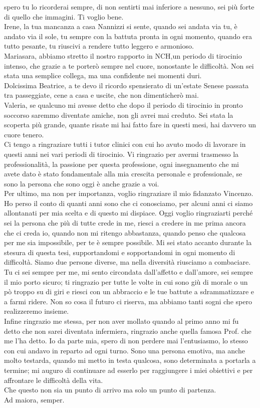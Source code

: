 spero tu lo ricorderai sempre, di non sentirti mai inferiore a nessuno, sei più forte di quello che immagini. 
Ti voglio bene.\\
Irene, la tua mancanza a casa Nannizzi si sente, quando sei andata via tu, è andato via il sole, tu sempre 
con la battuta pronta in ogni momento, quando era tutto pesante, tu riuscivi a rendere tutto leggero e armonioso.\\
Mariasara, abbiamo stretto il nostro rapporto in NCH,un periodo di tirocinio intenso, che grazie a te porterò sempre 
nel cuore, nonostante le difficoltà. Non sei stata una semplice collega, ma una confidente nei momenti duri.\\
Dolcissima Beatrice, a te devo il ricordo spensierato di un'estate Senese passata tra passeggiate, cene a casa e 
uscite, che non dimenticherò mai.\\
Valeria, se qualcuno mi avesse detto che dopo il periodo di tirocinio in pronto soccorso saremmo diventate amiche, 
non gli avrei mai creduto. Sei stata la scoperta più grande, quante risate mi hai fatto fare in questi mesi, 
hai davvero un cuore tenero.\\
Ci tengo a ringraziare tutti i tutor clinici con cui ho avuto modo di lavorare in questi anni nei vari periodi di 
tirocinio. Vi ringrazio per avermi trasmesso la professionalità, la passione per questa professione, ogni insegnamento 
che mi avete dato è stato fondamentale alla mia crescita personale e professionale, se sono la persona che sono 
oggi è anche grazie a voi.\\
Per ultimo, ma non per importanza, voglio ringraziare il mio fidanzato Vincenzo. Ho perso il conto di quanti anni sono 
che ci conosciamo, per alcuni anni ci siamo allontanati per mia scelta e di questo mi dispiace. Oggi voglio ringraziarti 
perché sei la persona che più di tutte crede in me, riesci a credere in me prima ancora che ci creda io, quando non mi 
ritengo abbastanza, quando penso che qualcosa per me sia impossibile, per te è sempre possibile. Mi sei stato accanto 
durante la stesura di questa tesi, supportandomi e sopportandomi in ogni momento di difficoltà. Siamo due persone diverse, 
ma nella diversità riusciamo a combaciare. Tu ci sei sempre per me, mi sento circondata dall’affetto e dall’amore, 
sei sempre il mio porto sicuro; ti ringrazio per tutte le volte in cui sono giù di morale o un pò troppo su di 
giri e riesci con un abbraccio e le tue battute a sdrammatizzare 
e a farmi ridere. Non so cosa il futuro ci riserva, ma abbiamo tanti sogni che spero realizzeremo insieme.\\
Infine ringrazio me stessa, per non aver mollato quando al primo anno mi fu detto che non sarei diventata infermiera, 
ringrazio anche quella famosa Prof. che me l’ha detto. Io da parte mia, spero di non perdere mai l’entusiasmo, 
lo stesso con cui andavo in reparto ad ogni turno. Sono una persona emotiva, ma anche molto testarda, quando mi metto in 
testa qualcosa, sono determinata a portarla a termine; mi auguro di continuare ad esserlo per raggiungere i miei 
obiettivi e per affrontare le difficoltà della vita.\\ 
Che questo non sia un punto di arrivo ma solo un punto di partenza.\\ 
Ad maiora, semper. 


